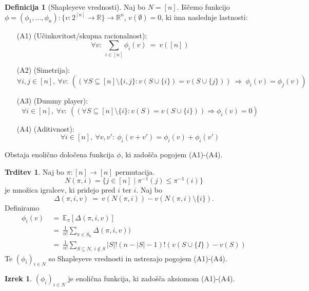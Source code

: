 \documentclass[11pt]{article}
\newcommand{\R}{\mathbb{R}}
\newcommand{\set}[1]{\{#1\}}
\newcommand{\oklepaj}[1]{\left(#1\right)}
\newcommand{\1}{\mathbbm{1}}
\theoremstyle{definition}
\newtheorem{definicija}{Definicija}[section]
\theoremstyle{definition}
\newtheorem{trditev}{Trditev}[section]
\theoremstyle{definition}
\newtheorem{izrek}{Izrek}[section]
\theoremstyle{definition}
\begin{document}
\begin{definicija}[Shapleyeve vrednosti]

Naj bo $N = [n]$. Iščemo funkcijo $\phi = (\phi_1,\ldots,\phi_n): \set{v:2^{[n]}\rightarrow\R}\rightarrow\R^n$, $v(\emptyset)=0$, ki ima naslednje lastnosti:
\begin{enumerate}

\item[(A1)] (Učinkovitost/skupna racionalnost):
$$\forall v: ~\sum_{i \in [n]} \phi_i(v) ~=~ v([n])$$

\item[(A2)] (Simetrija):
$$\forall i,j \in [n],~\forall v: ~\oklepaj{\oklepaj{\forall S \subseteq [n]\setminus\set{i,j}: v(S \cup \set{i}) = v(S \cup \set{j})} ~\Longrightarrow~ \phi_i(v) = \phi_j(v)}$$

\item[(A3)] (Dummy player):
$$\forall i \in [n],~\forall v: ~\oklepaj{\oklepaj{\forall S \subseteq [n]\setminus\set{i}: v(S) = v(S \cup \set{i})} \Longrightarrow \phi_i(v) = 0}$$

\item[(A4)] (Aditivnost):
$$\forall i \in [n],~\forall v,v': ~\phi_i(v+v') = \phi_i(v) + \phi_i(v')$$

\end{enumerate}
Obstaja enolično določena funkcija $\phi$, ki zadošča pogojem (A1)-(A4).

\end{definicija}
\vspace{0.5cm}

\begin{trditev}

Naj bo $\pi: [n] \rightarrow [n]$ permutacija. 
$$N(\pi,i) = \set{j \in [n] \mid \pi^{-1}(j) \leq \pi^{-1}(i)}$$
je množica igralcev, ki pridejo pred $i$ ter $i$. Naj bo
$$\Delta(\pi,i,v) ~=~ v\oklepaj{N(\pi,i)} - v\oklepaj{N(\pi,i)\setminus\set{i}}.$$
Definiramo
\begin{align*}
\phi_i(v) ~&=~ \mathbb{E}_\pi[\Delta(\pi,i,v)] \\
&=~ \frac{1}{n!} \sum_{\pi \in S_n} \Delta(\pi,i,v)) \\
&=~ \frac{1}{n!} \sum_{S \subseteq N,~i \notin S} |S|!(n-|S|-1)!(v(S \cup \set{I}) - v(S))
\end{align*}
Te $(\phi_i)_{i \in N}$ so Shapleyeve vrednosti in ustrezajo pogojem (A1)-(A4).

\end{trditev}
\vspace{0.5cm}

\begin{izrek}

$(\phi_i)_{i \in N}$ je enolična funkcija, ki zadošča aksiomom (A1)-(A4).

\end{izrek}
\vspace{0.5cm}


\pagebreak

\end{document}
